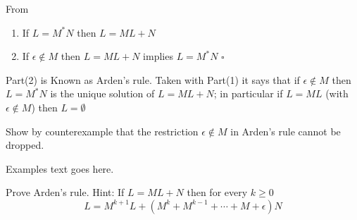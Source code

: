 From \cite[p78]{Wonham2018}
\begin{proposition}
	\begin{enumerate}
		\item If $L = M^{\ast}N$ then $L = ML + N$
		\item If $\epsilon\notin M$ then $L = ML + N$ implies $L = M^{\ast}N$ \hfill$\square$ 
	\end{enumerate}
\end{proposition}
Part(2) is Known as Arden's rule. Taken with Part(1) it says that if $\epsilon\notin M$ then $L = M^{\ast}N$ is the unique solution of $L = ML + N$; in particular if $L = ML$ (with $\epsilon \notin M$) then $L = \emptyset$

\begin{exercise}
	Show by counterexample that the restriction $\epsilon \notin M$ in Arden's rule cannot be dropped.
\end{exercise}
\begin{solution}
	Examples text goes here.  
\end{solution}

\begin{exercise}
	Prove Arden's rule. Hint: If $L = ML + N$ then for every $k\geq 0$
	$$L = M^{k+1}L + (M^{k} + M^{k-1} + \cdots + M + \epsilon)N$$
\end{exercise}

